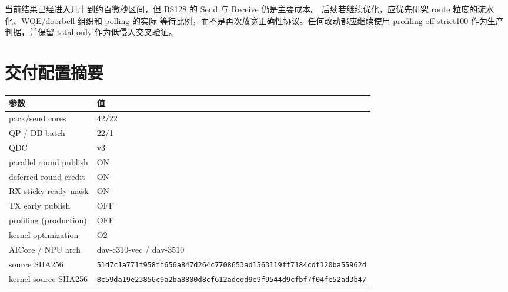 \documentclass[UTF8,a4paper,11pt]{ctexart}
\begin{document}
当前结果已经进入几十到约百微秒区间，但 BS128 的 Send 与 Receive 仍是主要成本。
后续若继续优化，应优先研究 route 粒度的流水化、WQE/doorbell 组织和 polling 的实际
等待比例，而不是再次放宽正确性协议。任何改动都应继续使用 profiling-off strict100
作为生产判据，并保留 total-only 作为低侵入交叉验证。

\appendix
\section{交付配置摘要}

\begin{longtable}{>{\ttfamily}p{}p{}}
\toprule
参数 & 值 \\
\midrule
pack/send cores & 42/22 \\
QP / DB batch & 22/1 \\
QDC & v3 \\
parallel round publish & ON \\
deferred round credit & ON \\
RX sticky ready mask & ON \\
TX early publish & OFF \\
profiling (production) & OFF \\
kernel optimization & O2 \\
AICore / NPU arch & dav-c310-vec / dav-3510 \\
source SHA256 & \nolinkurl{51d7c1a771f958ff656a847d264c7708653ad1563119ff7184cdf120ba55962d} \\
kernel source SHA256 & \nolinkurl{8c59da19e23856c9a2ba8800d8cf612adedd9e9f9544d9cfbf7f04fe52ad3b47} \\
\bottomrule
\end{longtable}
\end{document}
